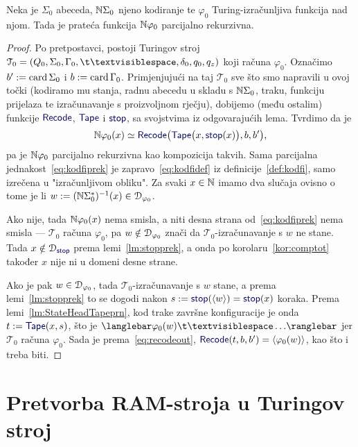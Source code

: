 \begin{teorem}[{name=[parcijalna rekurzivnost pratećih Turing-izračunljivih funkcija]}]\label{tm:tikp}
Neka je $\Sigma_0$ abeceda, ${\mathbb N}\Sigma_0$ njeno kodiranje te $\varphi_0$ Turing-izračunljiva funkcija nad njom. Tada je prateća funkcija ${\mathbb N}\varphi_0$ parcijalno rekurzivna.
\end{teorem}
\begin{proof}
Po pretpostavci, postoji Turingov stroj $\mathcal T_0=(Q_0,\Sigma_0,\Gamma_0,\bl,\delta_0,q_0,q_z)$ koji računa $\varphi_0$. Označimo $b':=\operatorname{card}\Sigma_0$ i $b:=\operatorname{card}\Gamma_0$. Primjenjujući na taj $\mathcal T_0$ sve što smo napravili u ovoj točki (kodiramo mu stanja, radnu abecedu u skladu s ${\mathbb N}\Sigma_0$, traku, funkciju prijelaza te izračunavanje s proizvoljnom rječju), dobijemo (među ostalim) funkcije $\f{Recode}$, $\f{Tape}$ i $\f{stop}$, sa svojstvima iz odgovarajućih lema. Tvrdimo da je
\begin{equation}\label{eq:kodfiprek}
    \N\varphi_0(x)\simeq
    \f{Recode}\bigl(\f{Tape}\bigl(x,\f{stop}(x)\bigr),b,b'\bigr)\text,
\end{equation}
pa je ${\mathbb N}\varphi_0$ parcijalno rekurzivna kao kompozicija takvih. Sama parcijalna jednakost~\eqref{eq:kodfiprek} je zapravo~\eqref{eq:kodfidef} iz definicije~\ref{def:kodfi}, samo izrečena u "izračunljivom obliku". Za svaki $x\in{\mathbb N}$ imamo dva slučaja ovisno o tome je li $w:=({\mathbb N}\Sigma_0^*)^{-1}(x)\in\mathcal D_{\varphi_0}$.

Ako nije, tada ${\mathbb N}\varphi_0(x)$ nema smisla, a niti desna strana od~\eqref{eq:kodfiprek} nema smisla --- $\mathcal T_0$ računa $\varphi_0$, pa $w\notin\mathcal D_{\varphi_0}$ znači da $\mathcal T_0$-izračunavanje s $w$ ne stane. Tada $x\notin\dom{\f{stop}}$ prema lemi~\ref{lm:stopprek}, a onda po korolaru~\ref{kor:comptot} također $x$ nije ni u domeni desne strane.

Ako je pak $w\in\mathcal D_{\varphi_0}$, tada $\mathcal T_0$-izračunavanje s $w$ stane, a prema lemi~\ref{lm:stopprek} to se dogodi nakon $s:=\f{stop}(\kr w)=\f{stop}(x)$ koraka. Prema lemi~\ref{lm:StateHeadTapeprn}, kod trake završne konfiguracije je onda $t:=\f{Tape}(x,s)$, što je $\knk{\varphi_0(w)\bl\ldots}$ jer $\mathcal T_0$ računa $\varphi_0$. Sada je prema~\eqref{eq:recodeout}, $\f{Recode}(t,b,b')=\kr{\varphi_0(w)}$, kao što i treba biti.
\end{proof}

\section{Pretvorba RAM-stroja u Turingov stroj}\label{sec:RAM>Turing}

